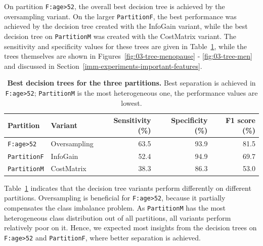 \documentclass[
  oneside]{book}
\begin{document}
On partition \texttt{F:age\textgreater{}52}, the overall best decision tree is achieved by the oversampling variant.
On the larger \texttt{PartitionF}, the best performance was achieved by the decision tree created with the InfoGain variant, while the best decision tree on \texttt{PartitionM} was created with the CostMatrix variant.
The sensitivity and specificity values for these trees are given in Table~\ref{tab:03-tree-performance-sens-spec}, while the trees themselves are shown in Figures~\ref{fig:03-tree-menopause} - \ref{fig:03-tree-men} and discussed in Section~\ref{imm-experiments-important-features}.



\begin{table}

\caption{\label{tab:03-tree-performance-sens-spec}\textbf{Best decision trees for the three partitions.} Best separation is achieved in \texttt{F:age\textgreater{}52}; \texttt{PartitionM} is the most heterogeneous one, the performance values are lowest.}
\centering
\begin{tabular}[t]{llrrr}
\toprule
\textbf{Partition} & \textbf{Variant} & \textbf{Sensitivity (\%)} & \textbf{Specificity (\%)} & \textbf{F1 score (\%)}\\
\midrule
\texttt{F:age>52} & Oversampling & 63.5 & 93.9 & 81.5\\
\texttt{PartitionF} & InfoGain & 52.4 & 94.9 & 69.7\\
\texttt{PartitionM} & CostMatrix & 38.3 & 86.3 & 53.0\\
\bottomrule
\end{tabular}
\end{table}

Table~\ref{tab:03-tree-performance-sens-spec} indicates that the decision tree variants perform differently on different partitions.
Oversampling is beneficial for \texttt{F:age\textgreater{}52}, because it partially compensates the class imbalance problem.
As \texttt{PartitionM} has the most heterogeneous class distribution out of all partitions, all variants perform relatively poor on it.
Hence, we expected most insights from the decision trees on \texttt{F:age\textgreater{}52} and \texttt{PartitionF}, where better separation is achieved.
\end{document}
